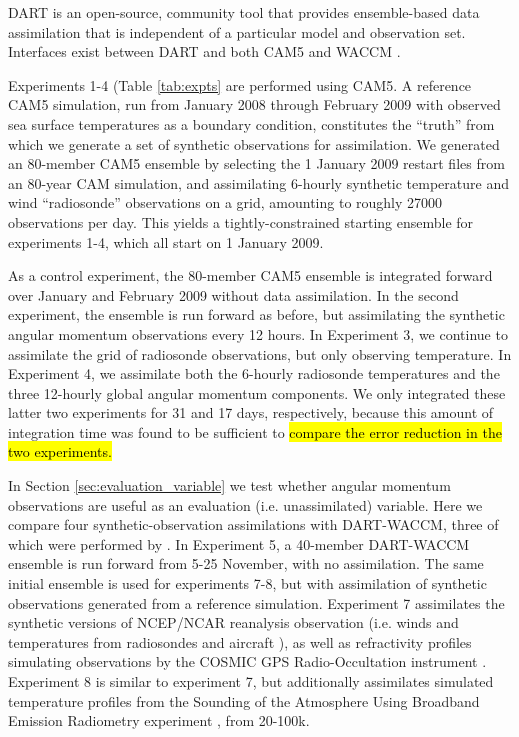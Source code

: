 DART \citep{Anderson2009} is an open-source, community tool that provides ensemble-based data assimilation that is independent of a particular model and observation set.
Interfaces exist between DART and both CAM5 \citep{Raeder2012} and WACCM \citep{Pedatella2013}.

Experiments 1-4 (Table \ref{tab:expts} are performed using CAM5.  
A reference CAM5 simulation, run from January 2008 through February 2009 with observed sea surface temperatures as a boundary condition, constitutes the ``truth'' from which we generate a set of synthetic observations for assimilation. 
We generated an 80-member CAM5 ensemble by selecting the 1 January 2009 restart files from an 80-year CAM simulation, and assimilating 6-hourly synthetic temperature and wind ``radiosonde'' observations on a grid, amounting to roughly 27000 observations per day. 
This yields a tightly-constrained starting ensemble for experiments 1-4, which all start on 1 January 2009.

As a control experiment, the 80-member CAM5 ensemble is integrated forward over January and February 2009 without data assimilation. 
In the second experiment, the ensemble is run forward as before, but assimilating the synthetic angular momentum observations every 12 hours.
In Experiment 3, we continue to assimilate the grid of radiosonde observations, but only observing temperature.
In Experiment 4, we assimilate both the 6-hourly radiosonde temperatures and the three 12-hourly global angular momentum components.
We only integrated these latter two experiments for 31 and 17 days, respectively, because this amount of integration time was found to be sufficient to \hl{compare the error reduction in the two experiments.} 


In Section \ref{sec:evaluation_variable} we test whether angular momentum observations are useful as an evaluation (i.e. unassimilated) variable. 
Here we compare four synthetic-observation assimilations with DART-WACCM, three of which were performed by \citet{Pedatella2013}.  
In Experiment 5, a 40-member DART-WACCM ensemble is run forward from 5-25 November, with no assimilation. 
The same initial ensemble is used for experiments 7-8, but with assimilation of synthetic observations generated from a reference simulation. 
Experiment 7 assimilates the synthetic versions of NCEP/NCAR reanalysis observation (i.e. winds and temperatures from radiosondes and aircraft \citep{Saha2010}), as well as refractivity profiles simulating observations by the COSMIC GPS Radio-Occultation instrument \citep{Anthes2008}.
Experiment 8 is similar to experiment 7, but additionally assimilates simulated temperature profiles from the Sounding of the Atmosphere Using Broadband Emission Radiometry experiment \citep[SABER]{Russell2009}, from 20-100k.

